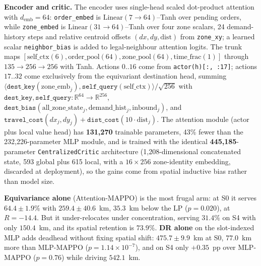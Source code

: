 \documentclass[3p,times,procedia]{elsarticle}
\begin{document}
\textbf{Encoder and critic.} The encoder uses single-head scaled dot-product attention with $d_{\mathrm{emb}}=64$: \texttt{order\_embed} is $\mathrm{Linear}(7\to64)$--Tanh over pending orders, while \texttt{zone\_embed} is $\mathrm{Linear}(31\to64)$--Tanh over four zone scalars, 24 demand-history steps and relative centroid offsets $(dx,dy,\mathrm{dist})$ from \texttt{zone\_xy}; a learned scalar \texttt{neighbor\_bias} is added to legal-neighbour attention logits. The trunk maps $[\text{self\_ctx}(6),\text{order\_pool}(64),\text{zone\_pool}(64),\text{time\_frac}(1)]$ through $135\to256\to256$ with Tanh. Actions $0..16$ come from \texttt{actor(h)[:, :17]}; actions $17..32$ come exclusively from the equivariant destination head, summing $\langle\texttt{dest\_key}(\text{zone\_emb}_j),\texttt{self\_query}(\text{self\_ctx})\rangle/\sqrt{256}$ with $\texttt{dest\_key},\texttt{self\_query}:\mathbb{R}^{64}\to\mathbb{R}^{256}$, $\texttt{dest\_bias}(\text{all\_zone\_state}_j,\text{demand\_hist}_j,\text{inbound}_j)$, and $\texttt{travel\_cost}(dx_j,dy_j)+\texttt{dist\_cost}(10\cdot\mathrm{dist}_j)$. The attention module (actor plus local value head) has \textbf{131,270} trainable parameters, 43\% fewer than the 232,226-parameter MLP module, and is trained with the identical \textbf{445,185}-parameter \texttt{CentralizedCritic} architecture (1,208-dimensional concatenated state, 593 global plus 615 local, with a $16\times256$ zone-identity embedding, discarded at deployment), so the gains come from spatial inductive bias rather than model size.

\textbf{Equivariance alone} (Attention-MAPPO) is the most frugal arm: at S0 it serves $64.4\pm1.9\%$ with $259.4\pm40.6$~km, $35.3$~km below the LP ($p=0.020$), at $R=-14.4$. But it under-relocates under concentration, serving $31.4\%$ on S4 with only $150.4$~km, and its spatial retention is $73.9\%$. \textbf{DR alone} on the slot-indexed MLP adds deadhead without fixing spatial shift: $475.7\pm9.9$~km at S0, $77.0$~km more than MLP-MAPPO ($p=1.14\times10^{-7}$), and on S4 only $+0.35$~pp over MLP-MAPPO ($p=0.76$) while driving $542.1$~km.
\end{document}
